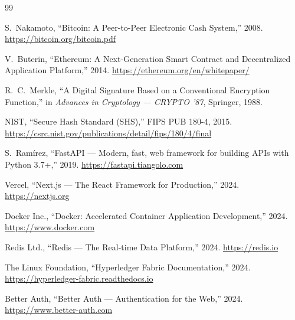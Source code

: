 \documentclass[12pt, a4paper]{report}
\begin{document}
\begin{thebibliography}{99}

S.~Nakamoto, ``Bitcoin: A Peer-to-Peer Electronic Cash System,'' 2008.
\url{https://bitcoin.org/bitcoin.pdf}

V.~Buterin, ``Ethereum: A Next-Generation Smart Contract and Decentralized
Application Platform,'' 2014.
\url{https://ethereum.org/en/whitepaper/}

R.~C.~Merkle, ``A Digital Signature Based on a Conventional Encryption
Function,'' in \textit{Advances in Cryptology — CRYPTO '87}, Springer, 1988.

NIST, ``Secure Hash Standard (SHS),'' FIPS PUB 180-4, 2015.
\url{https://csrc.nist.gov/publications/detail/fips/180/4/final}

S.~Ramírez, ``FastAPI — Modern, fast, web framework for building APIs with
Python 3.7+,'' 2019. \url{https://fastapi.tiangolo.com}

Vercel, ``Next.js — The React Framework for Production,'' 2024.
\url{https://nextjs.org}

Docker Inc., ``Docker: Accelerated Container Application Development,'' 2024.
\url{https://www.docker.com}

Redis Ltd., ``Redis — The Real-time Data Platform,'' 2024.
\url{https://redis.io}

The Linux Foundation, ``Hyperledger Fabric Documentation,'' 2024.
\url{https://hyperledger-fabric.readthedocs.io}

Better Auth, ``Better Auth — Authentication for the Web,'' 2024.
\url{https://www.better-auth.com}

\end{thebibliography}
\end{document}
